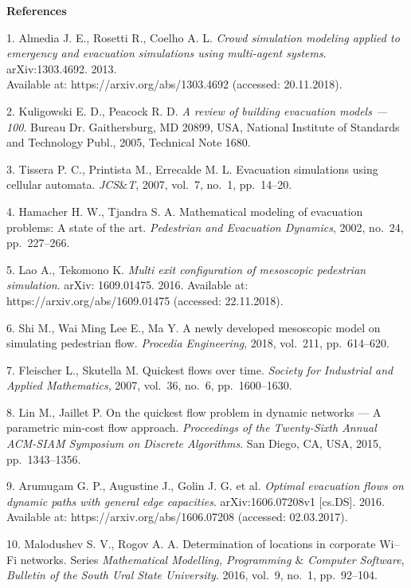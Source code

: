 
{\small

\vskip6mm

\noindent \textbf{References} }

\vskip 2mm

{\footnotesize

1. Almedia J. E., Rosetti R., Coelho A. L. {\it Crowd simulation
modeling applied to emergency and evacuation simulations using
multi-agent systems}. arXiv:1303.4692. 2013.\\ Available at:
https://arxiv.org/abs/1303.4692 (accessed: 20.11.2018).

2. Kuligowski E. D., Peacock R. D. {\it A review of building
evacuation models --- 100}. Bureau Dr. Gaithersburg, MD 20899,
USA, National Institute of Standards and Technology Publ., 2005,
Technical Note 1680.

3. Tissera P. C., Printista M., Errecalde M. L. Evacuation
simulations using cellular automata. {\it JCS$\&$T}, 2007, vol.~7,
no.~1, pp.~14--20.

4. Hamacher H. W., Tjandra S. A. Mathematical modeling of
evacuation problems: A state of the art. {\it Pedestrian and
Evacuation Dynamics}, 2002, no.~24, pp.~227--266.

5. Lao A., Tekomono K. {\it Multi exit configuration of mesoscopic
pedestrian simulation}. arXiv: 1609.01475. 2016. Available at:
https://arxiv.org/abs/1609.01475 (accessed: 22.11.2018).

6. Shi M., Wai Ming Lee E., Ma Y. A newly developed mesoscopic
model on simulating pedestrian flow. {\it Procedia Engineering},
2018, vol.~211, pp.~614--620.

7. Fleischer L., Skutella M. Quickest flows over time. {\it
Society for Industrial and Applied Mathematics}, 2007, vol.~36,
no.~6, pp.~1600--1630.

8. Lin M., Jaillet P. On the quickest flow problem in dynamic
networks --- A parametric min-cost flow approach. {\it Proceedings
of the Twenty-Sixth Annual ACM-SIAM Symposium on Discrete
Algorithms}. San Diego, CA, USA, 2015, pp.~1343--1356.

9. Arumugam G. P., Augustine J., Golin J. G. et al. {\it Optimal
evacuation flows on dynamic paths with general edge capacities}.
arXiv:1606.07208v1 [cs.DS]. 2016. Available at:
https://arxiv.org/abs/1606.07208 (accessed: 02.03.2017).

10. Malodushev S. V., Rogov A. A. Determination of locations in
corporate Wi--Fi networks. Series {\it Mathematical Modelling,
Programming $\&$ Computer Software}, {\it Bulletin of the South
Ural State University}. 2016, vol.~9, no.~1, pp.~92--104.

}
